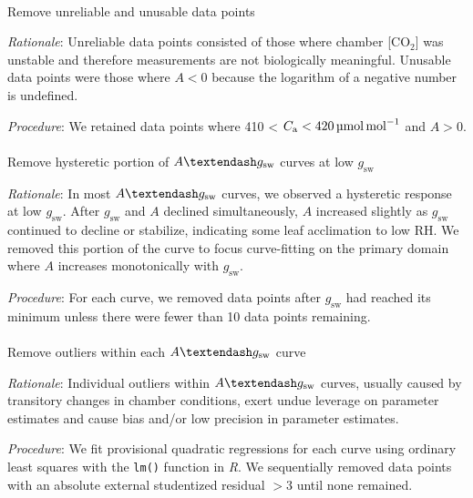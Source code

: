 \documentclass[
  letterpaper,
  DIV=11,
  numbers=noendperiod]{scrartcl}
\makeatletter
\let\oldparagraph\paragraph
\renewcommand{\paragraph}{
    \@ifstar
      \xxxParagraphStar
      \xxxParagraphNoStar
  }
\newcommand{\xxxParagraphStar}[1]{\oldparagraph*{#1}\mbox{}}
\newcommand{\xxxParagraphNoStar}[1]{\oldparagraph{#1}\mbox{}}
\newcommand{\agcurve}{$A \textendash g_\text{sw}$}
\newcommand{\cabetween}[2]{#1 < $C_\mathrm{a} < \qty{#2}{\micro\mol\raiseto{-1}\mol}$}
\newcommand{\gsw}{$g_\text{sw}$}
\newcommand{\rh}{$\mathrm{RH}$}
\makeatother
\begin{document}
\paragraph{Remove unreliable and unusable data
points}\label{remove-unreliable-and-unusable-data-points}

\emph{Rationale}: Unreliable data points consisted of those where
chamber {[}CO\(_2\){]} was unstable and therefore measurements are not
biologically meaningful. Unusable data points were those where \(A < 0\)
because the logarithm of a negative number is undefined.

\emph{Procedure}: We retained data points where \cabetween{410}{420} and
\(A> 0\).

\paragraph{\texorpdfstring{Remove hysteretic portion of \agcurve{}
curves at low
\gsw{}}{Remove hysteretic portion of  curves at low }}\label{remove-hysteretic-portion-of-curves-at-low}

\emph{Rationale}: In most \agcurve{} curves, we observed a hysteretic
response at low \gsw. After \gsw{} and \(A\) declined simultaneously,
\(A\) increased slightly as \gsw{} continued to decline or stabilize,
indicating some leaf acclimation to low \rh. We removed this portion of
the curve to focus curve-fitting on the primary domain where \(A\)
increases monotonically with \gsw{}.

\emph{Procedure}: For each curve, we removed data points after \gsw{}
had reached its minimum unless there were fewer than 10 data points
remaining.

\paragraph{\texorpdfstring{Remove outliers within each \agcurve{}
curve}{Remove outliers within each  curve}}\label{remove-outliers-within-each-curve}

\emph{Rationale}: Individual outliers within \agcurve{} curves, usually
caused by transitory changes in chamber conditions, exert undue leverage
on parameter estimates and cause bias and/or low precision in parameter
estimates.

\emph{Procedure}: We fit provisional quadratic regressions for each
curve using ordinary least squares with the \texttt{lm()} function in
\emph{R}. We sequentially removed data points with an absolute external
studentized residual \(> 3\) until none remained.
\end{document}
